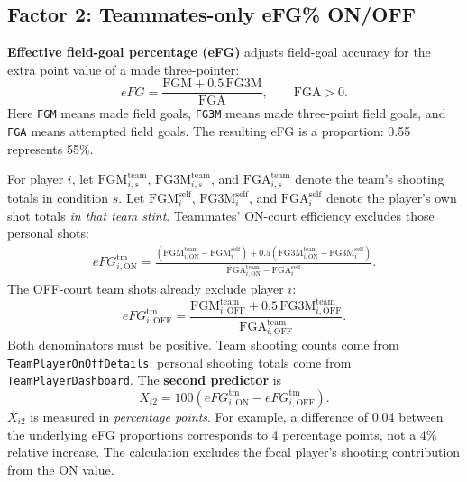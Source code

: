 \documentclass[11pt]{article}
\begin{document}
\subsection{Factor 2: Teammates-only eFG\% ON/OFF}
\textbf{Effective field-goal percentage (eFG)} adjusts field-goal accuracy
for the extra point value of a made three-pointer:
\begin{equation}
 eFG=\frac{\mathrm{FGM}+0.5\,\mathrm{FG3M}}{\mathrm{FGA}},
 \qquad \mathrm{FGA}>0.
 \label{eq:efg}
\end{equation}
Here \texttt{FGM} means made field goals, \texttt{FG3M} means made
three-point field goals, and \texttt{FGA} means attempted field goals.
The resulting eFG is a proportion: 0.55 represents 55\%.

For player $i$, let $\mathrm{FGM}^{\mathrm{team}}_{i,s}$,
$\mathrm{FG3M}^{\mathrm{team}}_{i,s}$, and
$\mathrm{FGA}^{\mathrm{team}}_{i,s}$ denote the team's shooting totals
in condition $s$. Let $\mathrm{FGM}^{\mathrm{self}}_i$,
$\mathrm{FG3M}^{\mathrm{self}}_i$, and $\mathrm{FGA}^{\mathrm{self}}_i$
denote the player's own shot totals \emph{in that team stint}. Teammates'
ON-court efficiency excludes those personal shots:
\begin{equation}
\begin{split}
 eFG^{\mathrm{tm}}_{i,\mathrm{ON}}=
 \frac{
 (\mathrm{FGM}^{\mathrm{team}}_{i,\mathrm{ON}}-\mathrm{FGM}^{\mathrm{self}}_i)
 +0.5(\mathrm{FG3M}^{\mathrm{team}}_{i,\mathrm{ON}}-\mathrm{FG3M}^{\mathrm{self}}_i)
 }{
 \mathrm{FGA}^{\mathrm{team}}_{i,\mathrm{ON}}-\mathrm{FGA}^{\mathrm{self}}_i
 }.
\end{split}
\label{eq:efg-on}
\end{equation}
The OFF-court team shots already exclude player $i$:
\begin{equation}
 eFG^{\mathrm{tm}}_{i,\mathrm{OFF}}=
 \frac{\mathrm{FGM}^{\mathrm{team}}_{i,\mathrm{OFF}}
 +0.5\,\mathrm{FG3M}^{\mathrm{team}}_{i,\mathrm{OFF}}}
 {\mathrm{FGA}^{\mathrm{team}}_{i,\mathrm{OFF}}}.
 \label{eq:efg-off}
\end{equation}
Both denominators must be positive. Team shooting counts come from
\texttt{TeamPlayerOnOffDetails}; personal shooting totals come from
\texttt{TeamPlayerDashboard}. The \textbf{second predictor} is
\begin{equation}
 \boxed{X_{i2}=100\left(eFG^{\mathrm{tm}}_{i,\mathrm{ON}}
 -eFG^{\mathrm{tm}}_{i,\mathrm{OFF}}\right).}
 \label{eq:efg-diff}
\end{equation}
$X_{i2}$ is measured in \emph{percentage points}. For example, a difference
of 0.04 between the underlying eFG proportions corresponds to 4 percentage
points, not a 4\% relative increase. The calculation excludes the focal
player's shooting contribution from the ON value.
\end{document}
